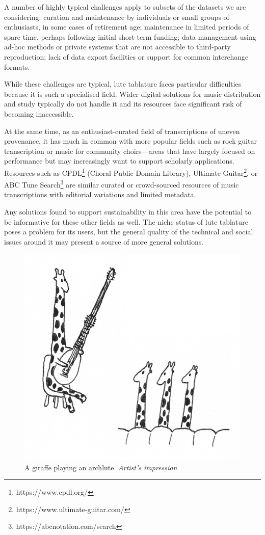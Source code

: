 \documentclass[sigconf, nonacm=true]{acmart}
\begin{document}
\begin{sloppypar}
  A number of highly typical challenges apply to subsets of the
  datasets we are considering: curation and maintenance by individuals
  or small groups of enthusiasts, in some cases of retirement age;
  maintenance in limited periods of spare time, perhaps following
  initial short-term funding; data management using ad-hoc methods or
  private systems that are not accessible to third-party reproduction;
  lack of data export facilities or support for common interchange
  formats.

  While these challenges are typical, lute tablature faces particular
  difficulties because it is such a specialised field. Wider digital
  solutions for music distribution and study typically do not handle
  it and its resources face significant risk of becoming inaccessible.

  At the same time, as an enthusiast-curated field of transcriptions
  of uneven provenance, it has much in common with more popular fields
  such as rock guitar transcription or music for community
  choirs---areas that have largely focused on performance but may
  increasingly want to support scholarly applications. Resources such
  as CPDL\footnote{https://www.cpdl.org/} (Choral Public Domain
  Library), Ultimate
  Guitar\footnote{https://www.ultimate-guitar.com/}, or ABC Tune
  Search\footnote{https://abcnotation.com/search} are similar curated
  or crowd-sourced resources of music transcriptions with editorial
  variations and limited metadata.

  Any solutions found to support sustainability in this area have the
  potential to be informative for these other fields as well. The
  niche status of lute tablature poses a problem for its users, but
  the general quality of the technical and social issues around it may
  present a source of more general solutions.

  \begin{figure}[b]
  \caption{A giraffe playing an archlute. {\it Artist's impression}}
  \includegraphics[width=0.7\columnwidth]{images/giraffe-archlute-2}
  \end{figure}
  

\end{sloppypar}
\end{document}
